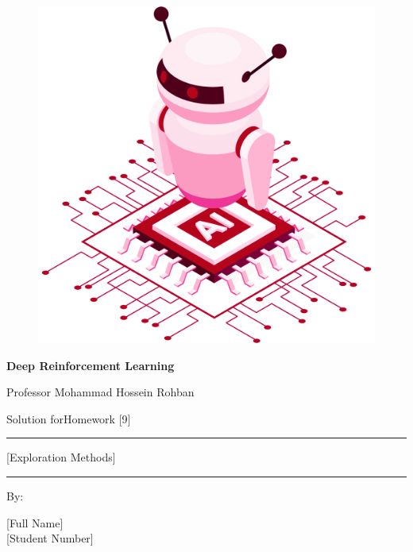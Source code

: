 \documentclass[12pt]{article}
\begin{document}
\thispagestyle{plain}

\begin{center}

\vspace*{-1.5cm}
\begin{figure}[!h]
    \centering
    \includegraphics[width=0.7\linewidth]{figs/cover-std.png}
\end{figure}

{

{\color{DarkBlue} {\fontsize{30}{50} \textbf{
Deep Reinforcement Learning
}}}

{\color{DarkBlue} {\Large
Professor Mohammad Hossein Rohban
}}
}


\vspace{20pt}

{


{\color{RedOrange}
{\Large
Solution forHomework [9]
}\\
}
{\color{BrickRed}
\rule{12cm}{0.5pt}

{\Huge
[Exploration Methods]
}
\rule{12cm}{0.5pt}
}

\vspace{10pt}

{\color{RoyalPurple} { \small By:} } \\
\vspace{10pt}

{\color{Blue} { \LARGE [Full Name] } } \\
\vspace{5pt}
{\color{RoyalBlue} { \Large [Student Number] } }


}
\end{center}
\end{document}
